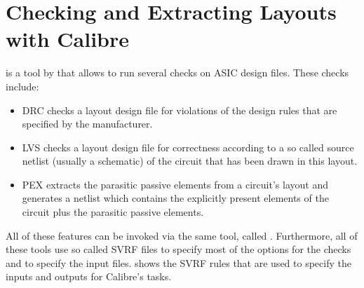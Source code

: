 \chapter{Checking and Extracting Layouts with Calibre}
\label{chap:calibre}

 is a tool by  that allows to run several
checks on \gls{ASIC} design files. These checks include:
\begin{itemize}
	\item \acrfull{DRC}
		checks a layout design file for violations of the design rules that are
		specified by the manufacturer.
	\item \acrfull{LVS}
		checks a layout design file for correctness according to a so called
		source netlist (usually a schematic) of the circuit that has been drawn
		in this layout.
	\item \acrfull{PEX}
		extracts the parasitic passive elements from a circuit's layout and
		generates a  netlist which contains the explicitly present
		elements of the circuit plus the parasitic passive elements.
\end{itemize}

All of these features can be invoked via the same tool, called .
Furthermore, all of these tools use so called \acrfull{SVRF} files to specify
most of the options for the checks and to specify the input files.
 shows the \gls{SVRF} rules that are used to specify the inputs
and outputs for Calibre's tasks.

